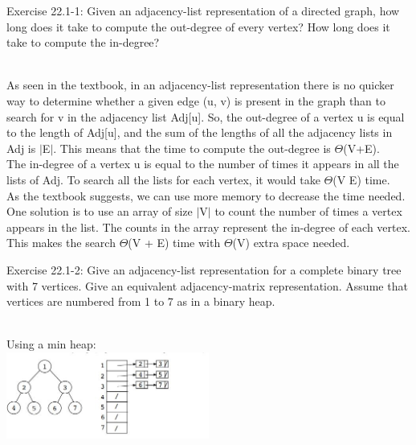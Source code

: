 \documentclass[addpoints,11pt]{exam}
\begin{document}
\begin{questions}


\question[5] Exercise 22.1-1:  Given an adjacency-list representation of a directed graph, how long does it take to compute the out-degree of every vertex?  How long does it take to compute the in-degree?
\begin{solutionorbox} \\ 
	As seen in the textbook, in an adjacency-list representation there is no quicker way to determine whether a given edge (u, v) is present in the graph than to search for v in the adjacency list Adj[u]. So, the out-degree of a vertex u is equal to the length of Adj[u], and the sum of the lengths of all the adjacency lists in Adj is $|$E$|$. This means that the time to compute the out-degree is $\Theta$(V+E). \\
	The in-degree of a vertex u is equal to the number of times it appears in all the lists of Adj. To search all the lists for each vertex, it would take $\Theta$(V E) time. \\ 
	As the textbook suggests, we can use more memory to decrease the time needed. One solution is to use an array of size $|$V$|$ to count the number of times a vertex appears in the list. The counts in the array represent the in-degree of each vertex. This makes the search $\Theta$(V + E) time with $\Theta$(V) extra space needed.
\end{solutionorbox}

\ifprintanswers
\newpage
\else
\bigskip
\fi



\question[5] Exercise 22.1-2: Give an adjacency-list representation for a complete binary tree with 7 vertices.  Give an equivalent adjacency-matrix representation.  Assume that vertices are numbered from 1 to 7 as in a binary heap.
\begin{solutionorbox} \\ 
	Using a min heap:\\
	\includegraphics[width=0.5\textwidth]{adjlist.JPG}
\end{solutionorbox}


\end{questions}
\end{document}
